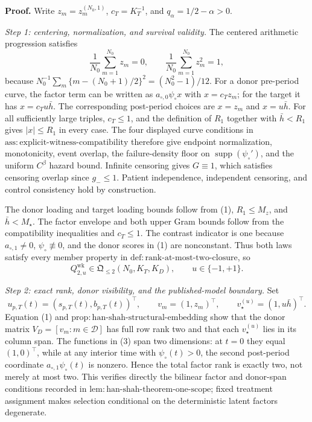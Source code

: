 \textbf{Proof.}
Write \(z_m=z_m^{(N_0,1)}\), \(c_T=K_T^{-1}\), and \(q_\alpha=1/2-\alpha>0\).

\emph{Step 1: centering, normalization, and survival validity.}
The centered arithmetic progression satisfies
\[
 \frac1{N_0}\sum_{m=1}^{N_0}z_m=0,
 \qquad
 \frac1{N_0}\sum_{m=1}^{N_0}z_m^2=1,                    \tag{1}
\]
because
\(N_0^{-1}\sum_m\{m-(N_0+1)/2\}^2=(N_0^2-1)/12\).
For a donor pre-period curve, the factor term can be written as
\(a_{\circ,0}\psi_\circ x\) with \(x=c_Tz_m\); for the target it has \(x=c_Tu\bar h\).  The corresponding post-period choices are \(x=z_m\) and \(x=u\bar h\).  For all sufficiently large triples, \(c_T\le1\), and the definition of \(R_1\) together with \(\bar h<R_1\) gives \(|x|\le R_1\) in every case.  The four displayed curve conditions in \(\mathrm{ass:explicit\mbox{-}witness\mbox{-}compatibility}\) therefore give endpoint normalization, monotonicity, event overlap, the failure-density floor on \(\operatorname{supp}(\psi_\circ')\), and the uniform \(C^\beta\) hazard bound.  Infinite censoring gives \(G\equiv1\), which satisfies censoring overlap since \(g_-\le1\).  Patient independence, independent censoring, and control consistency hold by construction.

The donor loading and target loading bounds follow from (1), \(R_1\le M_z\), and \(\bar h<M_\star\).  The factor envelope and both upper Gram bounds follow from the compatibility inequalities and \(c_T\le1\).  The contrast indicator is one because \(a_{\circ,1}\ne0\), \(\psi_\circ\not\equiv0\), and the donor scores in (1) are nonconstant.  Thus both laws satisfy every member property in \(\mathrm{def:rank\mbox{-}at\mbox{-}most\mbox{-}two\mbox{-}closure}\), so
\[
 Q_{2,u}^{\mathrm{wk}}\in\mathfrak Q_{\le2}(N_0,K_T,K_D),
 \qquad u\in\{-1,+1\}.                                  \tag{2}
\]

\emph{Step 2: exact rank, donor visibility, and the published-model boundary.}
Set
\[
 u_{p,T}(t)=(s_{p,T}(t),b_{p,T}(t))^\top,
 \qquad v_m=(1,z_m)^\top,
 \qquad v_\star^{(u)}=(1,u\bar h)^\top.                  \tag{3}
\]
Equation (1) and \(\mathrm{prop:han\mbox{-}shah\mbox{-}structural\mbox{-}embedding}\) show that the donor matrix \(V_D=[v_m:m\in\mathcal D]\) has full row rank two and that each \(v_\star^{(u)}\) lies in its column span.  The functions in (3) span two dimensions: at \(t=0\) they equal \((1,0)^\top\), while at any interior time with \(\psi_\circ(t)>0\), the second post-period coordinate \(a_{\circ,1}\psi_\circ(t)\) is nonzero.  Hence the total factor rank is exactly two, not merely at most two.  This verifies directly the bilinear factor and donor-span conditions recorded in \(\mathrm{lem:han\mbox{-}shah\mbox{-}theorem\mbox{-}one\mbox{-}scope}\); fixed treatment assignment makes selection conditional on the deterministic latent factors degenerate.

